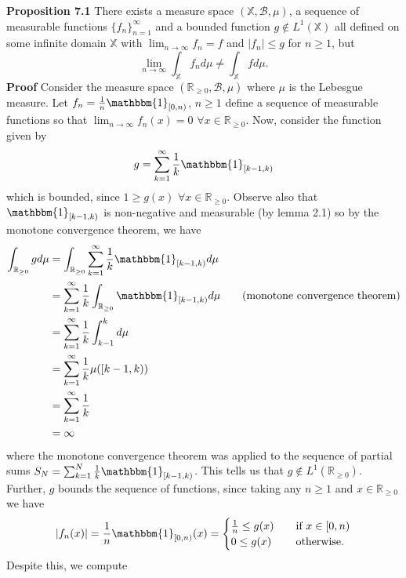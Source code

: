 \documentclass[11pt, letterpaper]{article}
\newcommand{\mbb}[1]{\mathbb{#1}}
\newcommand{\bbm}[1]{\mathbbm{#1}}
\newcommand{\mc}[1]{\mathcal{#1}}
\begin{document}
    \begin{center}
        \begin{minipage}[c]{0.85\linewidth}
            {\bf Proposition 7.1} There exists a measure space $(\mbb{X},\mc{B},\mu)$, a sequence of measurable functions $\{f_n\}_{n=1}^\infty$ and a bounded function $g\notin L^1(\mbb{X})$ all defined on some infinite domain $\mbb{X}$ with $\lim_{n\rightarrow\infty}f_n=f$ and $|f_n|\leq g$ for $n\geq 1$, but
            \[\lim_{n\rightarrow\infty}\int_\mbb{X}f_nd\mu\neq\int_\mbb{X}fd\mu.\]
            {\bf Proof} Consider the measure space $(\mbb{R}_{\geq 0},\mc{B},\mu)$ where $\mu$ is the Lebesgue measure. Let $f_n=\frac{1}{n}\bbm{1}_{[0,n)}$, $n\geq 1$ define a sequence of measurable functions so that $\lim_{n\rightarrow\infty}f_n(x)=0$ $\forall x\in\mbb{R}_{\geq 0}$. Now, consider the function given by
            \[g=\sum_{k=1}^\infty \frac{1}{k}\bbm{1}_{[k-1,k)}\]
            which is bounded, since $1\geq g(x)$ $\forall x\in\mbb{R}_{\geq 0}$. Observe also that $\bbm{1}_{[k-1,k)}$ is non-negative and measurable (by lemma 2.1) so by the monotone convergence theorem, we have
            \begin{align*}
                \int_{\mbb{R}_{\geq 0}}gd\mu&=\int_{\mbb{R}_{\geq 0}}\sum_{k=1}^\infty\frac{1}{k}\bbm{1}_{[k-1,k)}d\mu\\
                &=\sum_{k=1}^\infty\frac{1}{k}\int_{\mbb{R}_{\geq 0}}\bbm{1}_{[k-1,k)}d\mu\tag{monotone convergence theorem}\\
                &=\sum_{k=1}^\infty\frac{1}{k}\int_{k-1}^kd\mu\\
                &=\sum_{k=1}^\infty\frac{1}{k}\mu([k-1,k))\\
                &=\sum_{k=1}^\infty\frac{1}{k}\\
                &=\infty
            \end{align*}
            where the monotone convergence theorem was applied to the sequence of partial sums $S_N=\sum_{k=1}^{N}\frac{1}{k}\bbm{1}_{[k-1,k)}$. This tells us that $g\notin L^1(\mbb{R}_{\geq 0})$. Further, $g$ bounds the sequence of functions, since taking any $n\geq 1$ and $x\in\mbb{R}_{\geq 0}$ we have
            \[|f_n(x)|=\frac{1}{n}\bbm{1}_{[0,n)}(x)=\begin{cases}
                \frac{1}{n}\leq g(x)\quad&\text{if $x\in[0,n)$}\\
                0\leq g(x)\quad&\text{otherwise.}
            \end{cases}\]
            Despite this, we compute
            \begin{align*}

\end{align*}
\end{minipage}
\end{center}
\end{document}
